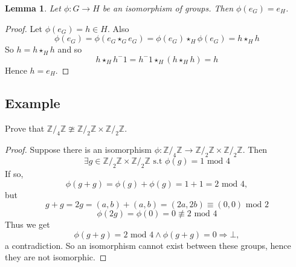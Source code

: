 \documentclass[12pt]{article}
\newtheorem{lemma}{Lemma}
\begin{document}
\begin{lemma}
    Let \(\phi : G\rightarrow H\) be an isomorphism of groups. 
    Then \(\phi(e_G) = e_H\).
\end{lemma}
\begin{proof}
    Let \(\phi (e_G) = h \in H\). Also 
    \[
        \phi(e_G) = \phi(e_G \star_G e_G) 
        = \phi(e_G) \star_H \phi(e_G)
        = h \star_H h 
    \]
    So \(h = h \star_H h\) and so 
    \[
        h \star_H h^-1 = h^-1 \star_H (h \star_H h) = h
    \]
    Hence \(h = e_H\).
    
\end{proof}

\subsection*{Example} 
Prove that \(\mathbb Z/_4 \mathbb Z \ncong 
\mathbb Z/_2 \mathbb Z \times \mathbb Z/_2 \mathbb Z\). 
\begin{proof}
    Suppose there is an isomorphism  
    \(
        \phi: \mathbb Z/_4 \mathbb Z \rightarrow
        \mathbb Z/_2 \mathbb Z \times \mathbb Z/_2 \mathbb Z
    \). 
    Then
    \[
        \exists g \in \mathbb Z/_2\mathbb Z \times \mathbb Z/_2\mathbb Z\text{ s.t } 
        \phi (g) = 1 \text{ mod } 4
    \] 
    If so, 
    \[ 
        \phi(g+g) = \phi(g)+\phi(g) = 1 + 1 = 2 \text{ mod } 4,
    \]
    but 
    \[ 
        g+g = 2g = (a,b)+(a,b) = (2a,2b) \equiv (0,0) \text{ mod } 2 
    \]
    \[ 
        \phi(2g) = \phi(0) = 0 \not\equiv 2 \text{ mod } 4
    \] 
    Thus we get 
    \[ 
        \phi(g+g) = 2 \text{ mod } 4 \land \phi(g+g) = 0 \Rightarrow \bot,
    \]
    a contradiction. So an isomorphism cannot exist between these groups, 
    hence they are not isomorphic.
\end{proof}
\end{document}
